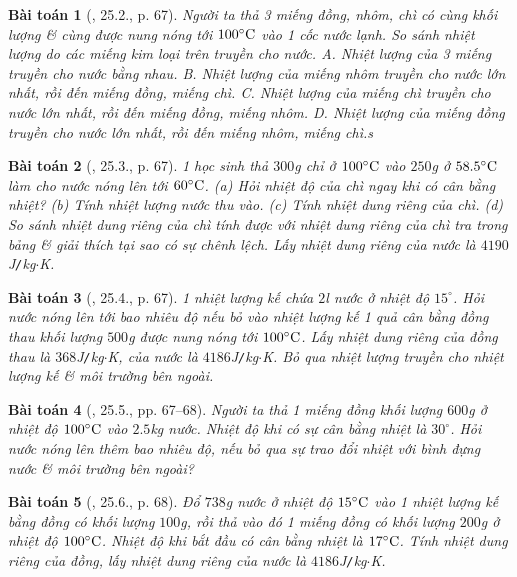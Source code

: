 \documentclass{article}
\newtheorem{baitoan}{Bài toán}
\begin{document}
\begin{baitoan}[\cite{SBT_Vat_Ly_8}, 25.2., p. 67]
	Người ta thả 3 miếng đồng, nhôm, chì có cùng khối lượng \& cùng được nung nóng tới $100^\circ{\rm C}$ vào 1 cốc nước lạnh. So sánh nhiệt lượng do các miếng kim loại trên truyền cho nước. {\sf A.} Nhiệt lượng của 3 miếng truyền cho nước bằng nhau. {\sf B.} Nhiệt lượng của miếng nhôm truyền cho nước lớn nhất, rồi đến miếng đồng, miếng chì. {\sf C.} Nhiệt lượng của miếng chì truyền cho nước lớn nhất, rồi đến miếng đồng, miếng nhôm. {\sf D.} Nhiệt lượng của miếng đồng truyền cho nước lớn nhất, rồi đến miếng nhôm, miếng chì.s
\end{baitoan}

\begin{baitoan}[\cite{SBT_Vat_Ly_8}, 25.3., p. 67]
	1 học sinh thả $300$\emph{g} chỉ ở $100^\circ{\rm C}$ vào $250$\emph{g} ở $58.5^\circ{\rm C}$ làm cho nước nóng lên tới $60^\circ{\rm C}$. (a) Hỏi nhiệt độ của chì ngay khi có cân bằng nhiệt? (b) Tính nhiệt lượng nước thu vào. (c) Tính nhiệt dung riêng của chì. (d) So sánh nhiệt dung riêng của chì tính được với nhiệt dung riêng của chì tra trong bảng \& giải thích tại sao có sự chênh lệch. Lấy nhiệt dung riêng của nước là $4190$\emph{J\texttt{/}kg$\cdot$K}.
\end{baitoan}

\begin{baitoan}[\cite{SBT_Vat_Ly_8}, 25.4., p. 67]
	1 nhiệt lượng kế chứa $2$\emph{l} nước ở nhiệt độ $15^\circ$. Hỏi nước nóng lên tới bao nhiêu độ nếu bỏ vào nhiệt lượng kế 1 quả cân bằng đồng thau khối lượng $500$\emph{g} được nung nóng tới $100^\circ{\rm C}$. Lấy nhiệt dung riêng của đồng thau là $368$\emph{J\texttt{/}kg$\cdot$K}, của nước là $4186$\emph{J\texttt{/}kg$\cdot$K}. Bỏ qua nhiệt lượng truyền cho nhiệt lượng kế \& môi trường bên ngoài.
\end{baitoan}

\begin{baitoan}[\cite{SBT_Vat_Ly_8}, 25.5., pp. 67--68]
	Người ta thả 1 miếng đồng khối lượng $600$\emph{g} ở nhiệt độ $100^\circ{\rm C}$ vào $2.5$\emph{kg} nước. Nhiệt độ khi có sự cân bằng nhiệt là $30^\circ$. Hỏi nước nóng lên thêm bao nhiêu độ, nếu bỏ qua sự trao đổi nhiệt với bình đựng nước \& môi trường bên ngoài?
\end{baitoan}

\begin{baitoan}[\cite{SBT_Vat_Ly_8}, 25.6., p. 68]
	Đổ $738$\emph{g} nước ở nhiệt độ $15^\circ{\rm C}$ vào 1 nhiệt lượng kế bằng đồng có khối lượng $100$\emph{g}, rồi thả vào đó 1 miếng đồng có khối lượng $200$\emph{g} ở nhiệt độ $100^\circ{\rm C}$. Nhiệt độ khi bắt đầu có cân bằng nhiệt là $17^\circ{\rm C}$. Tính nhiệt dung riêng của đồng, lấy nhiệt dung riêng của nước là $4186$\emph{J\texttt{/}kg$\cdot$K}.
\end{baitoan}
\end{document}
